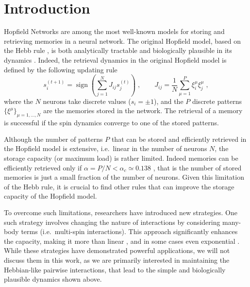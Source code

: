 \documentclass[a4paper]{cas-sc}
\DeclareMathOperator{\sign}{sign}
\begin{document}

\maketitle


\section{Introduction}

Hopfield Networks \cite{Hopfield1982} are among the most well-known models for storing and retrieving memories in a neural network.
The original Hopfield model, based on the Hebb rule \cite{hebb1949organization}, is both analytically tractable \cite{amit1985storing,amit1987statistical} and biologically plausible in its dynamics \cite{amit1989modeling}. Indeed, the retrieval dynamics in the original Hopfield model is defined by the following updating rule
\begin{equation}
    s_i^{(t+1)} = \sign \left(\sum_{j=1}^N J_{ij} s_j^{(t)}\right)\;, \qquad J_{ij} = \frac1N \sum_{\mu = 1}^P \xi_i^\mu \xi_j^\mu\;,
\end{equation}
where the $N$ neurons take discrete values ($s_i=\pm1$), and the $P$ discrete patterns $\{\xi^\mu\}_{\mu=1,\ldots,N}$ are the memories stored in the network. The retrieval of a memory is successful if the spin dynamics converge to one of the stored patterns.

Although the number of patterns $P$ that can be stored and efficiently retrieved in the Hopfield model is extensive, i.e.\ linear in the number of neurons $N$, the storage capacity (or maximum load) is rather limited. Indeed memories can be efficiently retrieved only if $\alpha=P/N < \alpha_c \simeq0.138$ \cite{amit1987statistical}, that is the number of stored memories is just a small fraction of the number of neurons.
Given this limitation of the Hebb rule, it is crucial to find other rules that can improve the storage capacity of the Hopfield model.

To overcome such limitations, researchers have introduced new strategies. One such strategy involves changing the nature of interactions by considering many-body terms (i.e.\ multi-spin interactions). This approach significantly enhances the capacity, making it more than linear \cite{gardner1987multiconnected, krotov2016dense, agliari2023dense}, and in some cases even exponential \cite{demircigil2017model, ramsauer2020hopfield, lucibello2023exponential}. While these strategies have demonstrated powerful applications, we will not discuss them in this work, as we are primarily interested in maintaining the Hebbian-like pairwise interactions, that lead to the simple and biologically plausible dynamics shown above.
\end{document}
